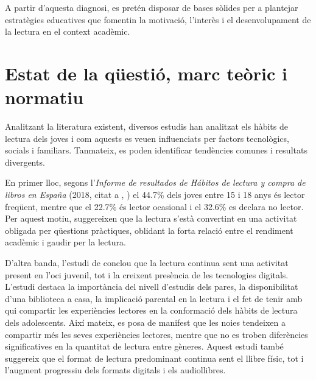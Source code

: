 \documentclass[12pt]{article}
\newcommand{\nestedtextcite}[2]{%
  (#1, citat a \citeauthor{#2}, \citeyear{#2})%
}
\begin{document}
A partir d’aquesta diagnosi, es pretén disposar de bases sòlides per a plantejar estratègies educatives que fomentin la motivació, l’interès i el desenvolupament de la lectura en el context acadèmic.

\newpage
\section{Estat de la qüestió, marc teòric i normatiu}
Analitzant la literatura existent, diversos estudis han analitzat els hàbits de lectura dels joves i com aquests es veuen influenciats per factors tecnològics, socials i familiars. Tanmateix, es poden identificar tendències comunes i resultats divergents.

En primer lloc, segons l'\emph{Informe de resultados de Hábitos de lectura y compra de libros en España} \nestedtextcite{2018}{sanches} el 44.7\% dels joves entre 15 i 18 anys és lector freqüent, mentre que el 22.7\% és lector ocasional i el 32.6\% es declara no lector. Per aquest motiu, \textcite{sanches} suggereixen que la lectura s'està convertint en una activitat obligada per qüestions pràctiques, oblidant la forta relació entre el rendiment acadèmic i gaudir per la lectura.

D'altra banda, l’estudi de \textcite{shutaleva} conclou que la lectura continua sent una activitat present en l’oci juvenil, tot i la creixent presència de les tecnologies digitals. L’estudi destaca la importància del nivell d'estudis dels pares, la disponibilitat d'una biblioteca a casa, la implicació parental en la lectura i el fet de tenir amb qui compartir les experiències lectores en la conformació dels hàbits de lectura dels adolescents. Així mateix, es posa de manifest que les noies tendeixen a compartir més les seves experiències lectores, mentre que no es troben diferències significatives en la quantitat de lectura entre gèneres. Aquest estudi també suggereix que el format de lectura predominant continua sent el llibre físic, tot i l’augment progressiu dels formats digitals i els audiollibres.
\end{document}
